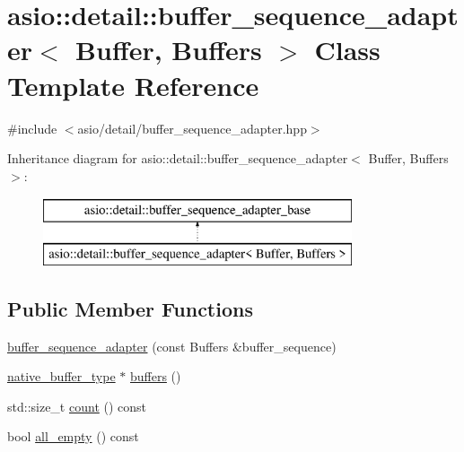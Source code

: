 \hypertarget{classasio_1_1detail_1_1buffer__sequence__adapter}{}\section{asio\+:\+:detail\+:\+:buffer\+\_\+sequence\+\_\+adapter$<$ Buffer, Buffers $>$ Class Template Reference}
\label{classasio_1_1detail_1_1buffer__sequence__adapter}


{\ttfamily \#include $<$asio/detail/buffer\+\_\+sequence\+\_\+adapter.\+hpp$>$}

Inheritance diagram for asio\+:\+:detail\+:\+:buffer\+\_\+sequence\+\_\+adapter$<$ Buffer, Buffers $>$\+:\begin{figure}[H]
\begin{center}
\leavevmode
\includegraphics[height=2.000000cm]{classasio_1_1detail_1_1buffer__sequence__adapter}
\end{center}
\end{figure}
\subsection*{Public Member Functions}
\begin{DoxyCompactItemize}
\item 
\hyperlink{classasio_1_1detail_1_1buffer__sequence__adapter_a2724ed5b8ddf473c14faaaf6ef3c36d4}{buffer\+\_\+sequence\+\_\+adapter} (const Buffers \&buffer\+\_\+sequence)
\item 
\hyperlink{classasio_1_1detail_1_1buffer__sequence__adapter__base_a91d037bd052777b8df514e6b94ec9e71}{native\+\_\+buffer\+\_\+type} $\ast$ \hyperlink{classasio_1_1detail_1_1buffer__sequence__adapter_a1a74a5b93ecc19233184445ee56f6c93}{buffers} ()
\item 
std\+::size\+\_\+t \hyperlink{classasio_1_1detail_1_1buffer__sequence__adapter_ad13a21573cc3e242703a5e3340dcaa36}{count} () const 
\item 
bool \hyperlink{classasio_1_1detail_1_1buffer__sequence__adapter_ae2136ffa6d50978fa5621dbb9099955c}{all\+\_\+empty} () const 
\end{DoxyCompactItemize}
